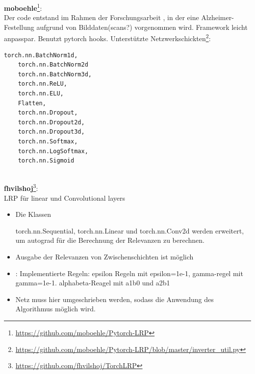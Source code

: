 \documentclass[twoside, 12pt,a4paper]{article}
\numberwithin{equation}{section}
\begin{document}
	\noindent \textbf{moboehle}\footnote{\url{https://github.com/moboehle/Pytorch-LRP}}:\\
	Der code entstand im Rahmen der Forschungsarbeit \cite{lrp_alzheimer}, in der eine Alzheimer-Festellung aufgrund von Bilddaten(scans?) vorgenommen wird. Framework leicht anpasspar. Benutzt pytorch hooks. 
	\noindent Unterstützte Netzwerkschickten\footnote{\url{https://github.com/moboehle/Pytorch-LRP/blob/master/inverter_util.py}}:\\

	\begin{lstlisting}[language=Python, caption=Verfügbare Schichten und Aktivierungsfunktionen]
	torch.nn.BatchNorm1d, 
	torch.nn.BatchNorm2d
	torch.nn.BatchNorm3d,
	torch.nn.ReLU, 
	torch.nn.ELU, 
	Flatten,
	torch.nn.Dropout,
	torch.nn.Dropout2d,
	torch.nn.Dropout3d,
	torch.nn.Softmax,
	torch.nn.LogSoftmax,
	torch.nn.Sigmoid
	
	\end{lstlisting}
	\noindent \textbf{fhvilshoj}\footnote{\url{https://github.com/fhvilshoj/TorchLRP}}:\\
	
	
	
	\noindent LRP für linear und Convolutional layers
	
	\begin{itemize}
		\item Die Klassen
	
	torch.nn.Sequential, torch.nn.Linear und torch.nn.Conv2d werden erweitert, um autograd für die Berechnung der Relevanzen zu berechnen.
	
		\item Ausgabe der Relevanzen von Zwischenschichten ist möglich
		\item: Implementierte Regeln: epsilon Regeln mit epsilon=1e-1, gamma-regel mit gamma=1e-1. alphabeta-Reagel mit a1b0 und a2b1
		\item Netz muss hier umgeschrieben werden, sodass die Anwendung des Algorithmus möglich wird.
	\end{itemize}
\end{document}
